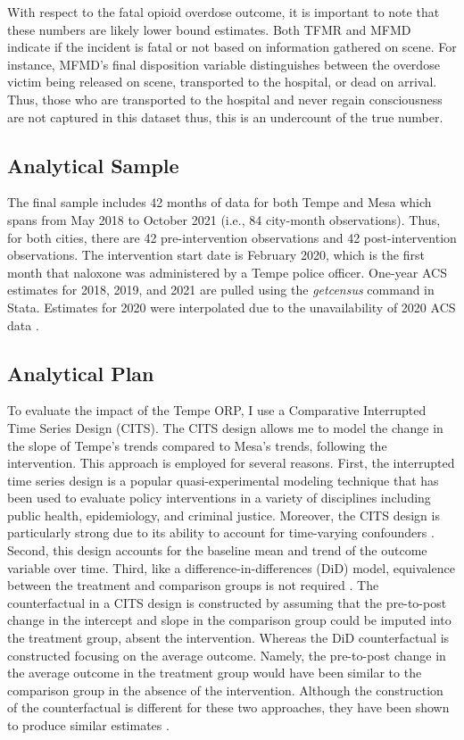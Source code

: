 With respect to the fatal opioid overdose outcome, it is important to note that these numbers are likely lower bound estimates. Both TFMR and MFMD indicate if the incident is fatal or not based on information gathered on scene. For instance, MFMD's final disposition variable distinguishes between the overdose victim being released on scene, transported to the hospital, or dead on arrival. Thus, those who are transported to the hospital and never regain consciousness are not captured in this dataset thus, this is an undercount of the true number.

\subsection{Analytical Sample}
The final sample includes 42 months of data for both Tempe and Mesa which spans from May 2018 to October 2021 (i.e., 84 city-month observations). Thus, for both cities, there are 42 pre-intervention observations and 42 post-intervention observations. The intervention start date is February 2020, which is the first month that naloxone was administered by a Tempe police officer. One-year ACS estimates for 2018, 2019, and 2021 are pulled using the \textit{getcensus} command in Stata. Estimates for 2020 were interpolated due to the unavailability of 2020 ACS data \parencite{chamberlain_relative_2016}.

\subsection{Analytical Plan}

To evaluate the impact of the Tempe ORP, I use a Comparative Interrupted Time Series Design (CITS). The CITS design allows me to model the change in the slope of Tempe's trends compared to Mesa's trends, following the intervention. This approach is employed for several reasons. First, the interrupted time series design is a popular quasi-experimental modeling technique that has been used to evaluate policy interventions in a variety of disciplines including public health, epidemiology, and criminal justice. Moreover, the CITS design is particularly strong due to its ability to account for time-varying confounders \parencite{lopez_bernal_use_2018}. Second, this design accounts for the baseline mean and trend of the outcome variable over time. Third, like a difference-in-differences (DiD) model, equivalence between the treatment and comparison groups is not required \parencite{anglin_validity_2023}. The counterfactual in a CITS design is constructed by assuming that the pre-to-post change in the intercept and slope in the comparison group could be imputed into the treatment group, absent the intervention. Whereas the DiD counterfactual is constructed focusing on the average outcome. Namely, the pre-to-post change in the average outcome in the treatment group would have been similar to the comparison group in the absence of the intervention. Although the construction of the counterfactual is different for these two approaches, they have been shown to produce similar estimates \parencite{anglin_validity_2023, somers_validity_2013}. 

